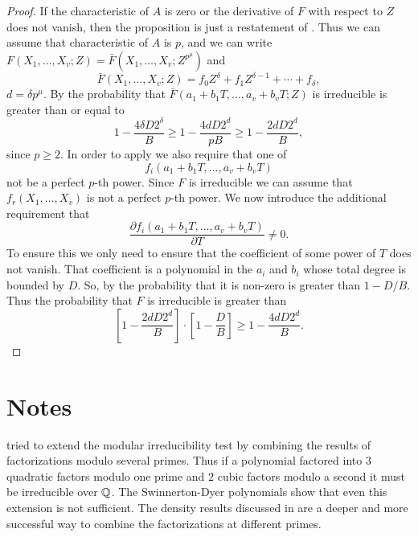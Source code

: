 \begin{proof}
If the characteristic of $A$ is zero or the derivative of $F$ with respect
to $Z$ does not vanish, then the proposition is just a
restatement of .  Thus we can assume that 
characteristic of $A$ is $p$, and we can write $F(X_1, \ldots, X_v; Z)
= \bar{F}(X_1, \ldots, X_v; Z^{p^{\mu}})$ and
\[
\bar{F}(X_1, \ldots, X_v; Z) = f_0 Z^{\delta} 
    + f_1 Z^{\delta-1} + \cdots + f_{\delta},
\]
$d = \delta p^{\mu}$.  By 
the probability that $\bar{F}(a_1+b_1T, \ldots, a_v+b_vT; Z)$ is
irreducible is greater than or equal to
\[
1 - \frac{4 \delta D 2^{\delta}}{B} \ge 1 - \frac{4d D 2^{d}}{pB}
\ge 1 - \frac{2dD2^d}{B},
\]
since $p \ge 2$.  In order to apply  we also
require that one of
\[
f_i(a_1 + b_1T, \ldots, a_v + b_vT)
\]
not be a perfect $p$-th power.  Since $F$ is irreducible we can
assume that $f_r(X_1, \ldots, X_v)$ is not a perfect $p$-th power.
We now introduce the additional requirement that
\[
\frac{\partial f_i(a_1 + b_1T, \ldots, a_v + b_vT)}{\partial T} \not =
0.
\]
To ensure this we only need to ensure that the coefficient of some
power of $T$ does not vanish.  That coefficient is a polynomial in the
$a_i$ and $b_i$ whose total degree is bounded by $D$.  So, by
 the probability that it is non-zero is
greater than $1 - D/B$.  Thus the probability that $F$ is irreducible
is greater than
\[
\left[1 - \frac{2dD2^d}{B}\right] \cdot
\left[1 - \frac{D}{B} \right] \ge
 1 - \frac{4dD2^d}{B}.
\]
\end{proof}


\section*{Notes}

\small

{\Musser} \cite{Musser78} tried to extend the modular irreducibility
test by combining the results of factorizations modulo several primes.
Thus if a polynomial factored into $3$ quadratic factors modulo one
prime and $2$ cubic factors modulo a second it must be irreducible
over $\mathbb{Q}$.  The Swinnerton-Dyer
polynomials show that even this
extension is not sufficient.  The density results discussed in
 are a deeper and more successful way to combine
the factorizations at different primes.

